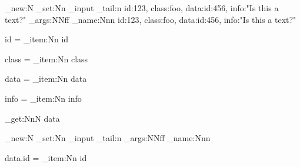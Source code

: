 \documentclass{article}
\def\readJson#1#2{%
  \prop_new:N #1
  \tl_set:Nn \cdr_input { \tl_tail:n { #2 } }
  \exp_args:NNff \inside_name:Nnn #1 {} { #2 }
}
\def\showById#1#2{%
  \prop_item:Nn #1 { #2 }
}
\def\getById#1#2#3{%
  \prop_get:NnN #1 { #2 } #3
}
\begin{document}
\makeatletter

\readJson{\MyJson}{{id:123, class:foo, data:{id:456}, info:"Is this a text?"}}

id = \showById{\MyJson}{id}

class = \showById{\MyJson}{class}

data = \showById{\MyJson}{data}

info = \showById{\MyJson}{info}

\getById{\MyJson}{data}{\MyJsonData}

\readJson{\temp}{{\MyJsonData}}

data.id = \showById{\temp}{id}

\makeatother
\end{document}
